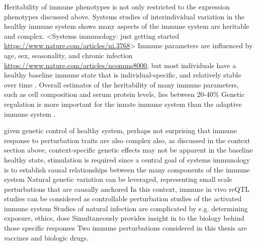 \begin{outline}
\1 Heritability of immune phenotypes is not only restricted to the expression phenotypes discussed above.
    \2 Systems studies of interindividual variation in the healthy immune system shows many aspects of the immune system are heritable and complex.
        \3 <Systems immunology: just getting started \url{https://www.nature.com/articles/ni.3768}>
    \2 Immune parameters are influenced by age, sex, seasonality, and chronic infection \autocite{brodin2015VariationHumanImmune,liston2016ShapingVariationHuman,brodin2017HumanImmuneSystem,patin2018NaturalVariationParameters,liston2018OriginsDiversityHuman} \url{https://www.nature.com/articles/ncomms8000},
    but most individuals have a healthy baseline immune state that is individual-specific, 
    and relatively stable over time \autocite{liston2016ShapingVariationHuman,brodin2017HumanImmuneSystem,lakshmikanth2020HumanImmuneSystem}.
    \2 Overall estimates of the heritability of many immune parameters, such as cell composition and serum protein levels, lies between 20-40\% \autocite{liston2016ShapingVariationHuman,brodin2017HumanImmuneSystem,patin2018NaturalVariationParameters,liston2018OriginsDiversityHuman}
    \2 Genetic regulation is more important for the innate immune system than the adaptive immune system \autocite{patin2018NaturalVariationParameters}.

\1 given genetic control of healthy system, perhaps not surprising that immune response to perturbation traits are also complex
    \2 also, as discussed in the context section above, context-specific genetic effects may not be apparent in the baseline healthy state, stimulation is required
    \2 since a central goal of systems immunology is to establish causal relationships between the many components of the immune system
        \3 Natural genetic variation can be leveraged, representing small scale perturbations that are causally anchored \autocite{tsang2015UtilizingPopulationVariation,villani2018SystemsImmunologyLearning}
    \2 In this context, immune in vivo reQTL studies can be considered as controllable perturbation studies of the activated immune system
        \3 Studies of natural infection are complicated by e.g. determining exposure, ethics, dose
    \2 Simultaneously provides insight in to the biology behind those specific responses
    \2 Two immune perturbations considered in this thesis are vaccines and biologic drugs.


\end{outline}
